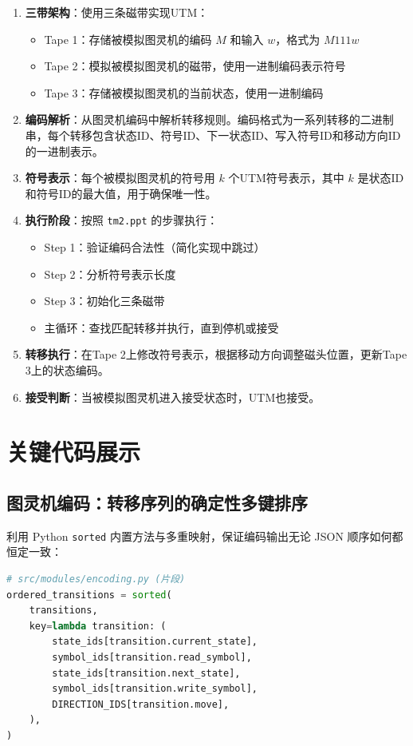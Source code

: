 \documentclass{sysucseexp}
\begin{document}
\begin{enumerate}
    \item \textbf{三带架构}：使用三条磁带实现UTM：
    \begin{itemize}
        \item Tape 1：存储被模拟图灵机的编码 $M$ 和输入 $w$，格式为 $M111w$
        \item Tape 2：模拟被模拟图灵机的磁带，使用一进制编码表示符号
        \item Tape 3：存储被模拟图灵机的当前状态，使用一进制编码
    \end{itemize}
    
    \item \textbf{编码解析}：从图灵机编码中解析转移规则。编码格式为一系列转移的二进制串，每个转移包含状态ID、符号ID、下一状态ID、写入符号ID和移动方向ID的一进制表示。
    
    \item \textbf{符号表示}：每个被模拟图灵机的符号用 $k$ 个UTM符号表示，其中 $k$ 是状态ID和符号ID的最大值，用于确保唯一性。
    
    \item \textbf{执行阶段}：按照 \texttt{tm2.ppt} 的步骤执行：
    \begin{itemize}
        \item Step 1：验证编码合法性（简化实现中跳过）
        \item Step 2：分析符号表示长度
        \item Step 3：初始化三条磁带
        \item 主循环：查找匹配转移并执行，直到停机或接受
    \end{itemize}
    
    \item \textbf{转移执行}：在Tape 2上修改符号表示，根据移动方向调整磁头位置，更新Tape 3上的状态编码。
    
    \item \textbf{接受判断}：当被模拟图灵机进入接受状态时，UTM也接受。
\end{enumerate}

\section{关键代码展示}

\subsection{图灵机编码：转移序列的确定性多键排序}
利用 Python \texttt{sorted} 内置方法与多重映射，保证编码输出无论 JSON 顺序如何都恒定一致：
\begin{lstlisting}[language=Python]
# src/modules/encoding.py (片段)
ordered_transitions = sorted(
    transitions,
    key=lambda transition: (
        state_ids[transition.current_state],
        symbol_ids[transition.read_symbol],
        state_ids[transition.next_state],
        symbol_ids[transition.write_symbol],
        DIRECTION_IDS[transition.move],
    ),
)
\end{lstlisting}
\end{document}
